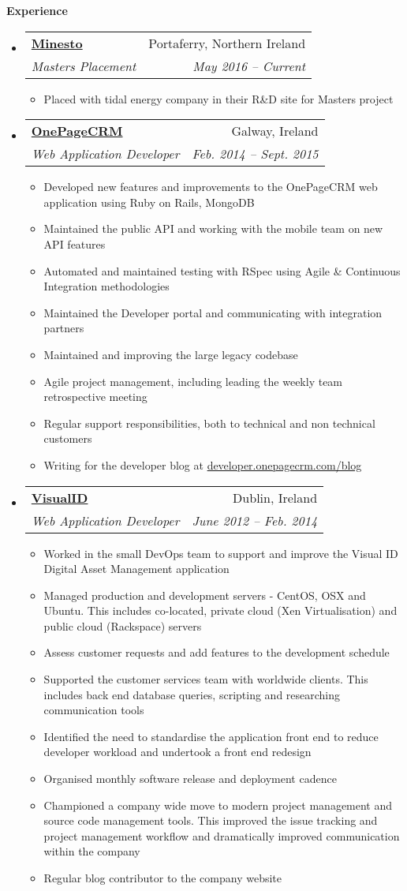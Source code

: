\documentclass[letterpaper,11pt]{article}
\makeatletter
\newcommand{\resitem}[1]{\item #1 \vspace{-2pt}}
\newcommand{\resheading}[1]{{\large \colorbox{mygrey}{\begin{minipage}{\textwidth}{\textbf{#1 \vphantom{p\^{E}}}}\end{minipage}}}}
\newcommand{\ressubheading}[4]{
\begin{tabular*}{6.5in}{l@{\extracolsep{\fill}}r}
		\textbf{#1} & #2 \\
		\textit{#3} & \textit{#4} \\
\end{tabular*}\vspace{-6pt}}
\makeatother
\begin{document}
\resheading{Experience}
  \begin{itemize}

  \item 
      \ressubheading{\href{http://www.minesto.com}{Minesto}}{Portaferry, Northern Ireland}
        {Masters Placement}{May 2016 -- Current}
        { \footnotesize
        \begin{itemize}
          \resitem{Placed with tidal energy company in their R\&D site for Masters project}
        \end{itemize}
        }
    \item 
      \ressubheading{\href{http://www.onepagecrm.com}{OnePageCRM}}{Galway, Ireland}
        {Web Application Developer}{Feb. 2014 -- Sept. 2015}
        { \footnotesize
        \begin{itemize}
          \resitem{Developed new features and improvements to the OnePageCRM web application using Ruby on Rails, MongoDB}
          \resitem{Maintained the public API and working with the mobile team on new API features}
          \resitem{Automated and maintained testing with RSpec using Agile \& Continuous Integration methodologies}
          \resitem{Maintained the Developer portal and communicating with integration partners}
          \resitem{Maintained and improving the large legacy codebase}
          \resitem{Agile project management, including leading the weekly team retrospective meeting}
          \resitem{Regular support responsibilities, both to technical and non technical customers}
          \resitem{Writing for the developer blog at \href{http://developer.onepagecrm.com/blog}{developer.onepagecrm.com/blog}}
        \end{itemize}
        }

      \item 
      \ressubheading{\href{http://visualid.com}{VisualID}}{Dublin, Ireland}{Web Application Developer}{June 2012 -- Feb. 2014}
        { \footnotesize
        \begin{itemize}
          \resitem{Worked in the small DevOps team to support and improve the Visual ID Digital Asset Management application}
          \resitem{Managed production and development servers - CentOS, OSX and Ubuntu. This includes co-located, private cloud (Xen Virtualisation) and public cloud (Rackspace) servers}
          \resitem{Assess customer requests and add features to the development schedule}
          \resitem{Supported the customer services team with worldwide clients. This includes back end database queries, scripting and researching communication tools}
          \resitem{Identified the need to standardise the application front end to reduce developer workload and undertook a front end redesign}
          \resitem{Organised monthly software release and deployment cadence}
          \resitem{Championed a company wide move to modern project management and source code management tools. This improved the issue tracking and project management workflow and dramatically improved communication within the company}
          \resitem{Regular blog contributor to the company website}
        \end{itemize}
        }
        

\end{itemize}
\end{document}
